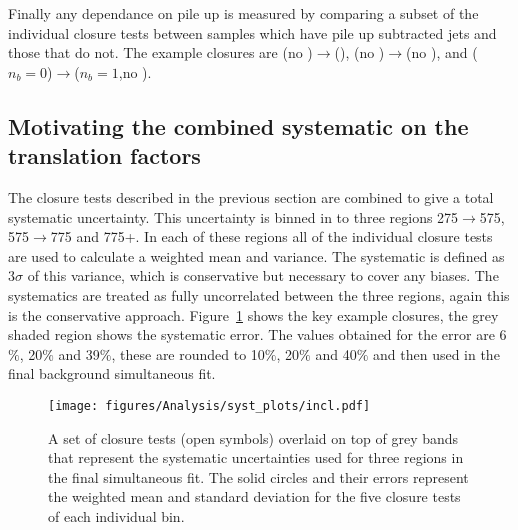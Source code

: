 Finally any dependance on pile up is measured by comparing a subset of the 
individual closure tests between samples which have pile up subtracted jets and 
those that do not. The example closures are \mj(no \alt)$\rightarrow$\mj(\altg),
\mj(no \alt)$\rightarrow$\mmj(no \alt), and \mj($n_b = 0$)$\rightarrow$\mj($n_b 
= 1$,no \alt).

\subsection{Motivating the combined systematic on the translation factors}
\label{sub:motivating_the_combined_systematic_on_the_translation_factors}
The closure tests described in the previous section are combined to give a 
total systematic uncertainty. This uncertainty is binned in to three \HT 
regions \unit{275}{\GeV}$\rightarrow$\unit{575}{\GeV}, 
\unit{575}{\GeV}$\rightarrow$\unit{775}{\GeV} and \unit{775}{\GeV}+. In each of 
these regions all of the individual closure tests are used to calculate a 
weighted mean and variance. The systematic is defined as $3\sigma$ of this 
variance, which is conservative but necessary to cover any biases. The 
systematics are treated as fully uncorrelated between the three regions, again 
this is the conservative approach. Figure~\ref{fig:closure-summary} shows the 
key example closures, the grey shaded region shows the systematic error. The 
values obtained for the error are 6$\%$, 20$\%$ and 39$\%$, these are rounded 
to 10$\%$, 20$\%$ and 40$\%$ and then used in the final background simultaneous 
fit.

\begin{figure}[!h]
  \begin{center}
    \texttt{[image: figures/Analysis/syst\_plots/incl.pdf]}
    \caption{A set of closure tests (open symbols) overlaid on top of
      grey bands that represent the systematic uncertainties used for
      three \HT regions in the final simultaneous fit. The solid
      circles and their errors represent the weighted mean and
      standard deviation for the five closure tests of each individual
      \HT bin.}
    \label{fig:closure-summary}
  \end{center}
\end{figure}




